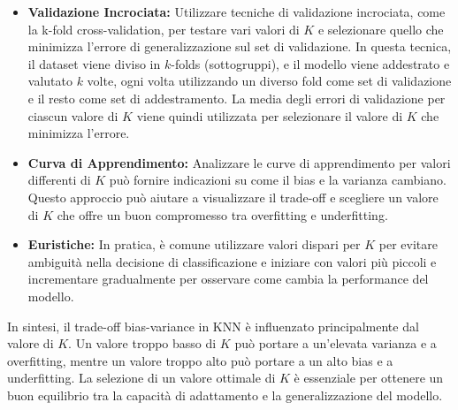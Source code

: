 \begin{itemize}
    \item \textbf{Validazione Incrociata:} Utilizzare tecniche di validazione incrociata, come la k-fold cross-validation, per testare vari valori di \( K \) e selezionare quello che minimizza l'errore di generalizzazione sul set di validazione.
    In questa tecnica, 
il dataset viene diviso in $k$-folds (sottogruppi), e il modello 
viene addestrato e valutato $k$ volte, ogni volta utilizzando un 
diverso fold come set di validazione e il resto come set di addestramento. 
La media degli errori di validazione per ciascun valore di $K$ viene quindi 
utilizzata per selezionare il valore di $K$ che minimizza l'errore.

    \item \textbf{Curva di Apprendimento:} Analizzare le curve di apprendimento per valori differenti di \( K \) può fornire indicazioni su come il bias e la varianza cambiano. Questo approccio può aiutare a visualizzare il trade-off e scegliere un valore di \( K \) che offre un buon compromesso tra overfitting e underfitting.

    \item \textbf{Euristiche:} In pratica, è comune utilizzare valori dispari per \( K \) per evitare ambiguità nella decisione di classificazione e iniziare con valori più piccoli e incrementare gradualmente per osservare come cambia la performance del modello.
\end{itemize}

In sintesi, il trade-off bias-variance in KNN è influenzato principalmente dal valore di \( K \). Un valore troppo basso di \( K \) può portare a un'elevata varianza e a overfitting, mentre un valore troppo alto può portare a un alto bias e a underfitting. La selezione di un valore ottimale di \( K \) è essenziale per ottenere un buon equilibrio tra la capacità di adattamento e la generalizzazione del modello.
